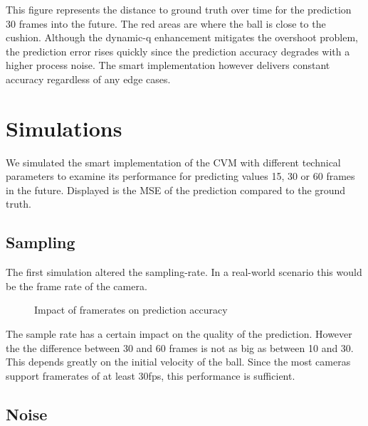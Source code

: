 \documentclass[notitlepage, a4paper, 11pt]{scrartcl}
\begin{document}
\begin{multicols}{2}
This figure represents the distance to ground truth over time for the prediction 30 frames into the future. 
The red areas are where the ball is close to the cushion. 
Although the dynamic-q enhancement mitigates the overshoot problem, the prediction error rises quickly since the prediction accuracy degrades with a higher process noise.
The smart implementation however delivers constant accuracy regardless of any edge cases.

\section{Simulations}

We simulated the smart implementation of the CVM with different technical parameters to examine its performance for predicting values 15, 30 or 60 frames in the future.
Displayed is the MSE of the prediction compared to the ground truth.

\subsection{Sampling}

The first simulation altered the sampling-rate. In a real-world scenario this would be the frame rate of the camera.

\begin{figure}[H]
    \centering
    \caption{Impact of framerates on prediction accuracy}
    \label{fig:framerate10}
\end{figure}

The sample rate has a certain impact on the quality of the prediction. However the the difference between 30 and 60 frames is not as big as between 10 and 30. 
This depends greatly on the initial velocity of the ball. Since the most cameras support framerates of at least 30fps, this performance is sufficient.

\subsection{Noise}


\end{multicols}
\end{document}
